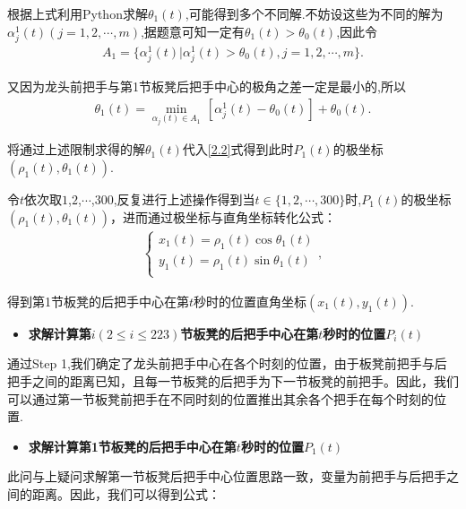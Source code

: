 \documentclass[../main.tex]{subfiles}
\begin{document}
  \par 根据上式利用Python求解\(\theta _1(t)\),可能得到多个不同解.不妨设这些为不同的解为\(\alpha _{j}^{1}(t) (j = 1,2,\cdots ,m)\),据题意可知一定有\(\theta _1(t)>\theta _0(t)\),因此令
  \begin{align}\label{1.........5}
  A_1 = \{ \alpha _{j}^{1}(t) |\alpha _{j}^{1}(t) >\theta _0(t),j = 1,2,\cdots ,m \} .
  \end{align}
  \par 又因为龙头前把手与第1节板凳后把手中心的极角之差一定是最小的,所以
  \begin{align}\label{1.........6}
  \theta _1(t)=\underset{\alpha _j(t)\in A_1}{\min}\,\left[ \alpha _{j}^{1}(t)-\theta _0\left( t \right) \right] +\theta _0\left( t \right) .
  \end{align}
  \par 将通过上述限制求得的解\(\theta _1(t)\)代入\eqref{2.2}式得到此时\(P_1(t)\)的极坐标\((\rho _1(t),\theta _1(t))\).
  \par 令\(t\)依次取\(1\),\(2\),\(\cdots\),\(300\),反复进行上述操作得到当\(t\in \{ 1,2,\cdots ,300 \}\)时,\(P_1(t)\)的极坐标\((\rho _1(t),\theta _1(t))\)，进而通过极坐标与直角坐标转化公式：
  \begin{align}
  \begin{cases}
  x_1(t)=\rho _1(t)\cos \theta _1(t)\\
  y_1(t)=\rho _1(t)\sin \theta _1(t)\\
  \end{cases}, \label{1.........7}   
  \end{align}
  \par 得到第1节板凳的后把手中心在第\(t\)秒时的位置直角坐标\((x_1(t),y_1(t))\).
  \begin{itemize}
      \item \textbf{求解计算第\(i(2\leqslant i\leqslant 223)\)节板凳的后把手中心在第\(t\)秒时的位置\(P_{i}(t)\)}
      \end{itemize} 
      \par 通过Step 1,我们确定了龙头前把手中心在各个时刻的位置，由于板凳前把手与后把手之间的距离已知，且每一节板凳的后把手为下一节板凳的前把手。因此，我们可以通过第一节板凳前把手在不同时刻的位置推出其余各个把手在每个时刻的位置.
      \begin{itemize}
      \item \textbf{求解计算第1节板凳的后把手中心在第\(t\)秒时的位置\(P_1(t)\)}
      \end{itemize}
  \par 此问与上疑问求解第一节板凳后把手中心位置思路一致，变量为前把手与后把手之间的距离。因此，我们可以得到公式：
\end{document}
